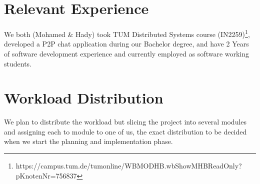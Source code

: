 \documentclass[a4paper,12pt]{extarticle}
\begin{document}
\section{Relevant Experience}
We both (Mohamed \& Hady) took TUM Distributed Systems course (IN2259)\footnote{https://campus.tum.de/tumonline/WBMODHB.wbShowMHBReadOnly?pKnotenNr=756837}, developed a P2P chat application during our Bachelor degree, and have 2 Years of software development experience and currently employed as software working students.

\section{Workload Distribution}
We plan to distribute the workload but slicing the project into several modules and assigning each to module to one of us, the exact distribution to be decided when we start the planning and implementation phase.
\end{document}
